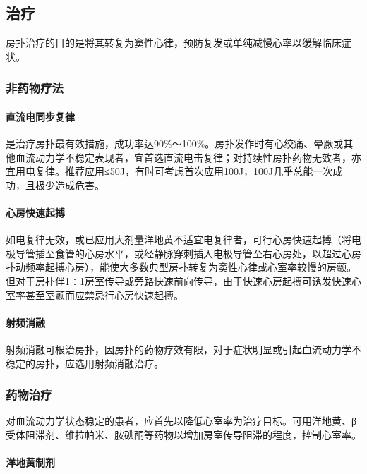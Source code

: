\subsection{治疗}

房扑治疗的目的是将其转复为窦性心律，预防复发或单纯减慢心率以缓解临床症状。

\subsubsection{非药物疗法}

\paragraph{直流电同步复律}

是治疗房扑最有效措施，成功率达90\%～100\%。房扑发作时有心绞痛、晕厥或其他血流动力学不稳定表现者，宜首选直流电击复律；对持续性房扑药物无效者，亦宜用电复律。推荐应用≤50J，有时可考虑首次应用100J，100J几乎总能一次成功，且极少造成危害。

\paragraph{心房快速起搏}

如电复律无效，或已应用大剂量洋地黄不适宜电复律者，可行心房快速起搏（将电极导管插至食管的心房水平，或经静脉穿刺插入电极导管至右心房处，以超过心房扑动频率起搏心房），能使大多数典型房扑转复为窦性心律或心室率较慢的房颤。但对于房扑伴1∶1房室传导或旁路快速前向传导，由于快速心房起搏可诱发快速心室率甚至室颤而应禁忌行心房快速起搏。

\paragraph{射频消融}

射频消融可根治房扑，因房扑的药物疗效有限，对于症状明显或引起血流动力学不稳定的房扑，应选用射频消融治疗。

\subsubsection{药物治疗}

对血流动力学状态稳定的患者，应首先以降低心室率为治疗目标。可用洋地黄、β受体阻滞剂、维拉帕米、胺碘酮等药物以增加房室传导阻滞的程度，控制心室率。

\paragraph{洋地黄制剂}

